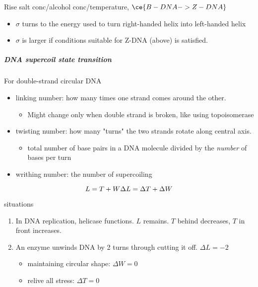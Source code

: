 \documentclass[]{article}
\let\oldsubparagraph\subparagraph
\renewcommand{\subparagraph}[1]{\oldsubparagraph{#1}\mbox{}}
\begin{document}
Rise salt conc/alcohol conc/temperature, \(\ce{B-DNA->Z-DNA}\)

\begin{itemize}
\item
  \(\sigma\) turns to the energy used to turn right-handed helix into
  left-handed helix
\item
  \(\sigma\) is larger if conditions suitable for Z-DNA (above) is
  satisfied.
\end{itemize}

\hypertarget{dna-supercoil-state-transition}{%
\subparagraph{DNA supercoil state
transition}\label{dna-supercoil-state-transition}}

For double-strand circular DNA

\begin{itemize}
\item
  linking number: how many times one strand comes around the other.

  \begin{itemize}
  \item
    Might change only when double strand is broken, like using
    topoisomerase
  \end{itemize}
\item
  twisting number: how many "turns" the two strands rotate along central
  axis.

  \begin{itemize}
  \item
    total number of base pairs in a DNA molecule divided by the
    \emph{number} of bases per turn
  \end{itemize}
\item
  writhing number: the number of supercoiling
\end{itemize}

\[L=T+W\\
\Delta L=\Delta T+\Delta W\]

situations

\begin{enumerate}
\def\labelenumi{\arabic{enumi}.}
\item
  In DNA replication, helicase functions. \(L\) remains. \(T\) behind
  decreases, \(T\) in front increases.
\item
  An enzyme unwinds DNA by 2 turns through cutting it off.
  \(\Delta L=-2\)

  \begin{itemize}
  \item
    maintaining circular shape: \(\Delta W=0\)
  \item
    relive all stress: \(\Delta T=0\)
  \end{itemize}
\end{enumerate}
\end{document}
